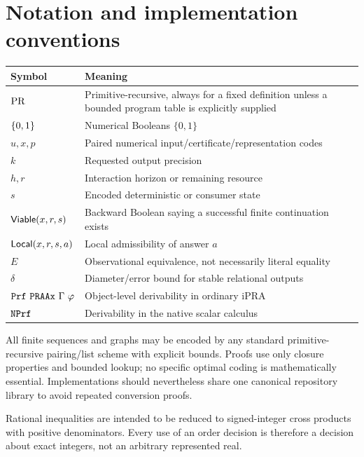 \section{Notation and implementation conventions}
\label{app:notation}

\begin{longtable}{@{}p{}p{}@{}}
\toprule
Symbol & Meaning \\
\midrule
\endhead
$\mathrm{PR}$ & Primitive-recursive, always for a fixed definition unless a bounded program table is explicitly supplied \\
$\{0,1\}$ & Numerical Booleans $\{0,1\}$ \\
$u,x,p$ & Paired numerical input/certificate/representation codes \\
$k$ & Requested output precision \\
$h,r$ & Interaction horizon or remaining resource \\
$s$ & Encoded deterministic or consumer state \\
$\mathsf{Viable}(x,r,s)$ & Backward Boolean saying a successful finite continuation exists \\
$\mathsf{Local}(x,r,s,a)$ & Local admissibility of answer $a$ \\
$E$ & Observational equivalence, not necessarily literal equality \\
$\delta$ & Diameter/error bound for stable relational outputs \\
$\Prf\ \PRAAx\ \Gamma\ \varphi$ & Object-level derivability in ordinary iPRA \\
$\texttt{NPrf}$ & Derivability in the native scalar calculus \\
\bottomrule
\end{longtable}

All finite sequences and graphs may be encoded by any standard primitive-recursive pairing/list scheme with explicit bounds.  Proofs use only closure properties and bounded lookup; no specific optimal coding is mathematically essential.  Implementations should nevertheless share one canonical repository library to avoid repeated conversion proofs.

Rational inequalities are intended to be reduced to signed-integer cross products with positive denominators.  Every use of an order decision is therefore a decision about exact integers, not an arbitrary represented real.
